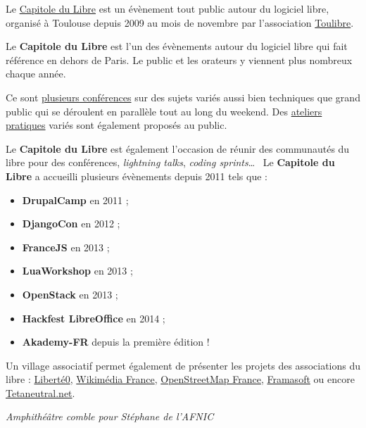 
Le \href{http://capitoledulibre.org}{Capitole du Libre} est un
 évènement tout public autour du logiciel libre,
 organisé à Toulouse depuis 2009 au mois de novembre
 par l'association \href{http://toulibre.org/}{Toulibre}.

Le \textbf{Capitole du Libre} est l'un des évènements autour du logiciel libre qui fait référence en dehors de Paris. Le public et les orateurs y viennent plus nombreux chaque année.

Ce sont \href{http://2014.capitoledulibre.org/programme/conferences/list/}{plusieurs conférences}
 sur des sujets variés aussi bien techniques que grand public qui se
 déroulent en parallèle tout au long du weekend.
Des \href{http://2014.capitoledulibre.org/programme/ateliers/list/}{ateliers pratiques}
 variés sont également proposés au public.


 
\Separateur

Le \textbf{Capitole du Libre} est également l'occasion de réunir des 
communautés du libre pour des conférences, \textit{lightning talks}, 
\textit{coding sprints}\dots ~ Le \textbf{Capitole du Libre} a 
accueilli plusieurs évènements depuis 2011 tels que :
\begin{itemize}[label=$\bullet$]
\item \textbf{DrupalCamp} en 2011 ;
\item \textbf{DjangoCon} en 2012 ;
\item \textbf{FranceJS} en 2013 ;
\item \textbf{LuaWorkshop} en 2013 ;
\item \textbf{OpenStack} en 2013 ;
\item \textbf{Hackfest LibreOffice}  en 2014 ;
\item \textbf{Akademy-FR} depuis la première édition !
\end{itemize}

\Separateur

Un village associatif permet également de présenter les projets des associations du libre : \href{http://liberte0.org/wiki/index.php?title=Accueil}{Liberté0},
 \href{http://wikimedia.fr/}{Wikimédia France},
 \href{http://openstreetmap.fr/}{OpenStreetMap France},
 \href{http://framasoft.net/}{Framasoft}
 ou encore \href{http://tetaneutral.net/}{Tetaneutral.net}.

\begin{center}
\textit{Amphithéâtre comble pour Stéphane  de l'AFNIC}
\end{center}

